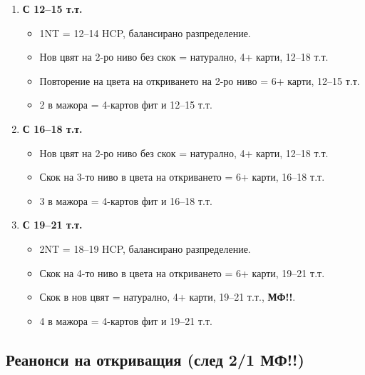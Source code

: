 \documentclass[10pt,a5paper]{extarticle}
\begin{document}
\begin{enumerate}
    \item \textbf{С 12–15 т.т.}
        \begin{itemize}
            \item[] 1NT = 12–14 HCP, балансирано разпределение.
            \item[] Нов цвят на 2-ро ниво без скок = натурално, 4+ карти, 12–18 т.т.
            \item[] Повторение на цвета на откриването на 2-ро ниво = 6+ карти, 12–15 т.т.
            \item[] 2 в мажора = 4-картов фит и 12–15 т.т.
        \end{itemize}

    \item \textbf{С 16–18 т.т.}
        \begin{itemize}
            \item[] Нов цвят на 2-ро ниво без скок = натурално, 4+ карти, 12–18 т.т.
            \item[] Скок на 3-то ниво в цвета на откриването = 6+ карти, 16–18 т.т.
            \item[] 3 в мажора = 4-картов фит и 16–18 т.т.
        \end{itemize}

    \item \textbf{С 19–21 т.т.}
        \begin{itemize}
            \item[] 2NT = 18–19 HCP, балансирано разпределение.
            \item[] Скок на 4-то ниво в цвета на откриването = 6+ карти, 19–21 т.т.
            \item[] Скок в нов цвят = натурално, 4+ карти, 19–21 т.т., \textbf{МФ!!}.
            \item[] 4 в мажора = 4-картов фит и 19–21 т.т.
        \end{itemize}
\end{enumerate}

\subsection*{Реанонси на откриващия (след 2/1 МФ!!)}
\end{document}
